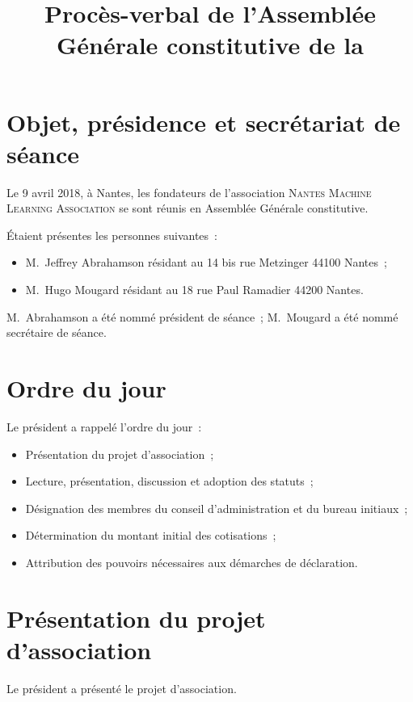 \documentclass[12pt]{article}
\title{Procès-verbal de l'Assemblée Générale constitutive de la \Nom}
\date{}
\newcommand{\Nom}{\textsc{Nantes Machine Learning Association}}
\begin{document}
\maketitle

\section{Objet, présidence et secrétariat de séance}
\label{sec:objet}

Le 9 avril 2018, à Nantes, les fondateurs de l'association \Nom{} se
sont réunis en Assemblée Générale constitutive.

Étaient présentes les personnes suivantes :

\begin{itemize}
\item M.~Jeffrey Abrahamson résidant au 14 bis rue Metzinger 44100
  Nantes ;
\item M.~Hugo Mougard résidant au 18 rue Paul Ramadier 44200 Nantes.
\end{itemize}

M.~Abrahamson a été nommé président de séance ; M.~Mougard a été nommé
secrétaire de séance.

\section{Ordre du jour}
\label{sec:ordre-du-jour}

Le président a rappelé l'ordre du jour :

\begin{itemize}
\item Présentation du projet d'association ;
\item Lecture, présentation, discussion et adoption des statuts ;
\item Désignation des membres du conseil d'administration et du bureau
  initiaux ;
\item Détermination du montant initial des cotisations ;
\item Attribution des pouvoirs nécessaires aux démarches de déclaration.
\end{itemize}

\section{Présentation du projet d'association}
\label{sec:presentation-du-projet-d-association}

Le président a présenté le projet d'association.
\end{document}
